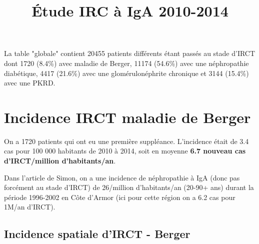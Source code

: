 \documentclass[11pt,a4paper]{article}\usepackage[]{graphicx}\usepackage[]{color}
\title{Étude IRC à IgA 2010-2014}
\begin{document}
\maketitle

\tableofcontents

\newpage























La table "globale" contient 20455 patients différents étant passés au stade d'IRCT dont 1720 (8.4\%) avec maladie de Berger, 11174 (54.6\%) avec une néphropathie diabétique, 4417 (21.6\%) avec une glomérulonéphrite chronique et 3144 (15.4\%) avec une PKRD.

\section{Incidence IRCT maladie de Berger}



On a 1720 patients qui ont eu une première suppléance. L'incidence était de 3.4 cas pour 100 000 habitants de 2010 à 2014, soit en moyenne \textbf{6.7 nouveau cas d'IRCT/million d'habitants/an}. 

Dans l'article de Simon, on a une incidence de néphropathie à IgA (donc pas forcément au stade d'IRCT) de 26/million d'habitants/an (20-90+ ans) durant la période 1996-2002 en Côte d'Armor (ici pour cette région on a 6.2 cas pour 1M/an d'IRCT). %

  \subsection{Incidence spatiale d'IRCT - Berger}
\end{document}
